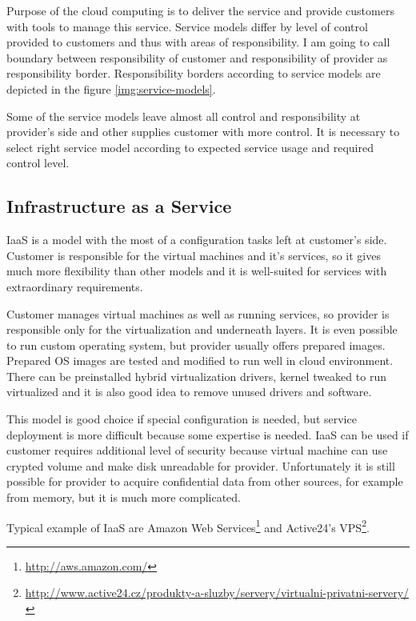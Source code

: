 
Purpose of the cloud computing is to deliver the service and provide customers with tools to manage this service. Service models differ by level of control provided to customers and thus with areas of responsibility. I am going to call boundary between responsibility of customer and responsibility of provider as responsibility border. Responsibility borders according to service models are depicted in the figure \ref{img:service-models}.

Some of the service models leave almost all control and responsibility at provider's side and other supplies customer with more control. It is necessary to select right service model according to expected service usage and required control level.

\subsection{Infrastructure as a Service}
\Ac{IaaS} is a model with the most of a configuration tasks left at customer's side. Customer is responsible for the virtual machines and it's services, so it gives much more flexibility than other models and it is well-suited for services with extraordinary requirements. 

Customer manages virtual machines as well as running services, so provider is responsible only for the virtualization and underneath layers. It is even possible to run custom operating system, but provider usually offers prepared images. Prepared \Ac{OS} images are tested and modified to run well in cloud environment. There can be preinstalled hybrid virtualization drivers, kernel tweaked to run virtualized and it is also good idea to remove unused drivers and software. 

This model is good choice if special configuration is needed, but service deployment is more difficult because some expertise is needed. \Ac{IaaS} can be used if customer requires additional level of security because virtual machine can use crypted volume and make disk unreadable for provider. Unfortunately it is still possible for provider to acquire confidential data from other sources, for example from memory, but it is much more complicated.

Typical example of \Ac{IaaS} are Amazon Web Services\footnote{\url{http://aws.amazon.com/}} and Active24's VPS\footnote{\url{http://www.active24.cz/produkty-a-sluzby/servery/virtualni-privatni-servery/}}.

